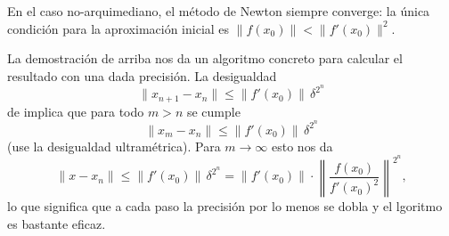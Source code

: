 \documentclass{article}
\numberwithin{equation}{section}
\theoremstyle{definition}
\begin{document}
\begin{ejemplo}
\begin{center}
  \end{center}

  En el caso no-arquimediano, el método de Newton siempre converge: la única
  condición para la aproximación inicial es $\|f (x_0)\| < \|f' (x_0)\|^2$.
\end{ejemplo}

La demostración de arriba nos da un algoritmo concreto para calcular
el resultado con una dada precisión. La desigualdad
$$\|x_{n+1} - x_n\| \le \|f' (x_0)\| \, \delta^{2^n}$$
de  implica que para todo $m > n$
se cumple
$$\|x_m - x_n\| \le \|f' (x_0)\| \, \delta^{2^n}$$
(use la desigualdad ultramétrica). Para $m \to \infty$ esto nos da
\[ \|x - x_n\| \le \|f' (x_0)\| \, \delta^{2^n} =
   \|f' (x_0)\| \cdot \left\|\frac{f (x_0)}{f' (x_0)^2}\right\|^{2^n}, \]
lo que significa que a cada paso la precisión por lo menos se dobla y
el lgoritmo es bastante eficaz.
\end{document}
